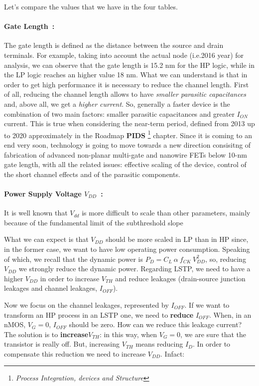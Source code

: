 \documentclass[a4paper, 12pt, twoside, openright]{report}
\begin{document}
\noindent Let's compare the values that we have in the four tables.

\paragraph{Gate Length~:} The gate length is defined as the distance between the source and drain terminals. For example, taking into account the actual node (i.e.2016 year) for analysis, we can observe that the gate length is 15.2 nm for the HP logic, while in the LP logic reaches an higher value 18 nm. What we can understand is that in order to get high performance it is necessary to reduce the channel length. First of all, reducing the channel length allows to have \emph{smaller parasitic capacitances} and, above all, we get a \emph{higher current}. So, generally a faster device is the combination of two main factors: smaller  parasitic capacitances and greater $I_{ON}$ current.
This is true when considering the near-term period, defined from 2013 up to 2020 approximately in the Roadmap \textbf{PIDS} \footnote{\emph{Process Integration, devices and Structure}} chapter. Since it is coming to an end very soon, technology is going to move towards a new direction consisitng of fabrication of advanced non-planar multi-gate and nanowire FETs below 10-nm gate length, with all the related issues: effective scaling of the device, control of the short channel effects and of the parasitic components.

\paragraph{Power Supply Voltage $V_{DD}$~:}
It is well known that $V_{dd}$ is more difficult to scale than other parameters, mainly because of the fundamental limit of the subthreshold slope 

What we can expect is that  $V_{DD}$ should be more scaled in LP than in HP since, in the former case, we want to have low operating power consumption. 
Speaking of which, we recall that the dynamic power is $P_{D} = C_L \ \alpha \  f_{CK} \ V_{DD}^2$, so, reducing $V_{DD}$ we strongly reduce the dynamic power. Regarding LSTP, we need to have a higher $V_{DD}$ in order to increase $V_{TH}$ and reduce leakages (drain-source junction leakages and channel leakages, $I_{OFF}$). 

Now we focus on the channel leakages, represented by $I_{OFF}$. If we want to transform an HP process in an LSTP one, we need to \textbf{reduce} $I_{OFF}$. When, in an nMOS, $V_G = 0$, $I_{OFF}$ should be zero. How can we reduce this leakage current? The solution is to \textbf{increase}$ V_{TH}$: in this way, when $V_{G} = 0$, we are sure that the transistor is really off. But, increasing $V_{TH}$ means reducing $I_{D}$. In order to compensate this reduction we need to increase $V_{DD}$. Infact:
\end{document}
